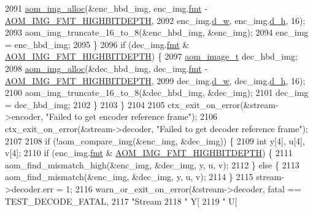 \begin{DoxyCodeInclude}
{{{{{{{{{{{{{{{{{{{{{{{{{{{{{{{{{{{{{{{{{{{{{2091       \hyperlink{aom__image_8h_a570db29fbd122951235a08fe9375f6bb}{aom\_img\_alloc}(&enc\_hbd\_img, enc\_img.\hyperlink{structaom__image_a6c64b1ab918d80d52eb8f5d6d957e825}{fmt} - 
      \hyperlink{aom__image_8h_a607b37d91f75442f54223ecd85f1b6cb}{AOM\_IMG\_FMT\_HIGHBITDEPTH},
2092                     enc\_img.\hyperlink{structaom__image_a89f80b1f58d608b9d2080635f4359034}{d\_w}, enc\_img.\hyperlink{structaom__image_ab986419a1f0fff93a2dc505f47194988}{d\_h}, 16);
2093       aom\_img\_truncate\_16\_to\_8(&enc\_hbd\_img, &enc\_img);
2094       enc\_img = enc\_hbd\_img;
2095     \}
2096     \textcolor{keywordflow}{if} (dec\_img.\hyperlink{structaom__image_a6c64b1ab918d80d52eb8f5d6d957e825}{fmt} & \hyperlink{aom__image_8h_a607b37d91f75442f54223ecd85f1b6cb}{AOM\_IMG\_FMT\_HIGHBITDEPTH}) \{
2097       \hyperlink{structaom__image}{aom\_image\_t} dec\_hbd\_img;
2098       \hyperlink{aom__image_8h_a570db29fbd122951235a08fe9375f6bb}{aom\_img\_alloc}(&dec\_hbd\_img, dec\_img.\hyperlink{structaom__image_a6c64b1ab918d80d52eb8f5d6d957e825}{fmt} - 
      \hyperlink{aom__image_8h_a607b37d91f75442f54223ecd85f1b6cb}{AOM\_IMG\_FMT\_HIGHBITDEPTH},
2099                     dec\_img.\hyperlink{structaom__image_a89f80b1f58d608b9d2080635f4359034}{d\_w}, dec\_img.\hyperlink{structaom__image_ab986419a1f0fff93a2dc505f47194988}{d\_h}, 16);
2100       aom\_img\_truncate\_16\_to\_8(&dec\_hbd\_img, &dec\_img);
2101       dec\_img = dec\_hbd\_img;
2102     \}
2103   \}
2104 
2105   ctx\_exit\_on\_error(&stream->encoder, \textcolor{stringliteral}{"Failed to get encoder reference frame"});
2106   ctx\_exit\_on\_error(&stream->decoder, \textcolor{stringliteral}{"Failed to get decoder reference frame"});
2107 
2108   \textcolor{keywordflow}{if} (!aom\_compare\_img(&enc\_img, &dec\_img)) \{
2109     \textcolor{keywordtype}{int} y[4], u[4], v[4];
2110     \textcolor{keywordflow}{if} (enc\_img.\hyperlink{structaom__image_a6c64b1ab918d80d52eb8f5d6d957e825}{fmt} & \hyperlink{aom__image_8h_a607b37d91f75442f54223ecd85f1b6cb}{AOM\_IMG\_FMT\_HIGHBITDEPTH}) \{
2111       aom\_find\_mismatch\_high(&enc\_img, &dec\_img, y, u, v);
2112     \} \textcolor{keywordflow}{else} \{
2113       aom\_find\_mismatch(&enc\_img, &dec\_img, y, u, v);
2114     \}
2115     stream->decoder.err = 1;
2116     warn\_or\_exit\_on\_error(&stream->decoder, fatal == TEST\_DECODE\_FATAL,
2117                           \textcolor{stringliteral}{"Stream %
2118                           \textcolor{stringliteral}{" Y[%
2119                           \textcolor{stringliteral}{" U[%
}}}}}}}}}}}}}}}}}}}}}}}}}}}}}}}}}}}}}}}}}}}}}}}}
\end{DoxyCodeInclude}
